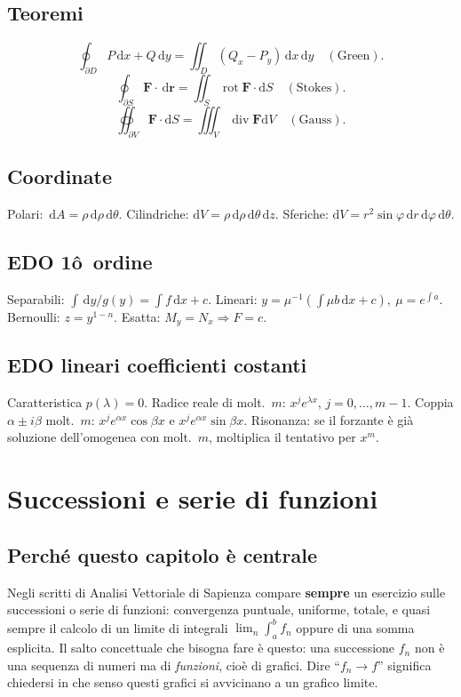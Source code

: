 \documentclass[11pt,a4paper,openany]{book}
\theoremstyle{plain}
\theoremstyle{definition}
\theoremstyle{remark}
\newcommand{\dd}{\,\mathrm{d}}
\newcommand{\Div}{\operatorname{div}}
\newcommand{\Rot}{\operatorname{rot}}
\newcommand{\F}{\mathbf{F}}
\newcommand{\rr}{\mathbf{r}}
\newcommand{\dS}{\mathrm{d}S}
\newcommand{\dV}{\mathrm{d}V}
\begin{document}
\section*{Teoremi}
\[
\oint_{\partial D}P\dd x+Q\dd y=\iint_D(Q_x-P_y)\dd x\dd y \quad(\text{Green}).
\]
\[
\oint_{\partial S}\F\cdot\dd\rr=\iint_S\Rot\F\cdot\dS \quad(\text{Stokes}).
\]
\[
\oiint_{\partial V}\F\cdot\dS=\iiint_V\Div\F\dV \quad(\text{Gauss}).
\]

\section*{Coordinate}
Polari: $\dd A=\rho\dd\rho\dd\theta$.
Cilindriche: $\dV=\rho\dd\rho\dd\theta\dd z$.
Sferiche: $\dV=r^2\sin\varphi\dd r\dd\varphi\dd\theta$.

\section*{EDO 1\^o\ ordine}
Separabili: $\int\dd y/g(y)=\int f\dd x+c$.
Lineari: $y=\mu^{-1}(\int\mu b\dd x+c),\ \mu=e^{\int a}$.
Bernoulli: $z=y^{1-n}$.
Esatta: $M_y=N_x\Rightarrow F=c$.

\section*{EDO lineari coefficienti costanti}
Caratteristica $p(\lambda)=0$. Radice reale di molt.\ $m$: $x^j e^{\lambda x}$,
$j=0,\dots,m-1$. Coppia $\alpha\pm i\beta$ molt.\ $m$: $x^j e^{\alpha x}\cos\beta x$
e $x^j e^{\alpha x}\sin\beta x$. Risonanza: se il forzante \`e gi\`a soluzione
dell'omogenea con molt.\ $m$, moltiplica il tentativo per $x^m$.


\chapter{Successioni e serie di funzioni}

\section*{Perch\'e questo capitolo \`e centrale}

Negli scritti di Analisi Vettoriale di Sapienza compare \textbf{sempre}
un esercizio sulle successioni o serie di funzioni: convergenza puntuale,
uniforme, totale, e quasi sempre il calcolo di un limite di integrali
$\lim_n\int_a^b f_n$ oppure di una somma esplicita. Il salto concettuale
che bisogna fare \`e questo: una successione $f_n$ non \`e una sequenza
di numeri ma di \emph{funzioni}, cio\`e di grafici. Dire ``$f_n\to f$'' significa
chiedersi in che senso questi grafici si avvicinano a un grafico limite.
\end{document}
